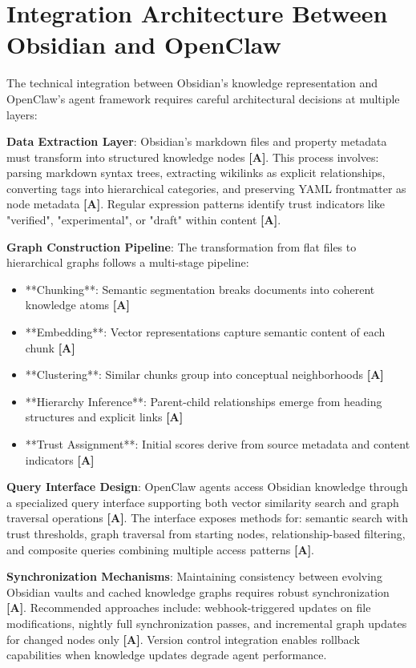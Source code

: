 \documentclass[a4paper,11pt]{article}
\newcommand{\alabel}{\textbf{\textcolor{acolor}{[A]}}}
\begin{document}
\section{Integration Architecture Between Obsidian and OpenClaw}

The technical integration between Obsidian's knowledge representation and OpenClaw's agent framework requires careful architectural decisions at multiple layers:


\textbf{Data Extraction Layer}: Obsidian's markdown files and property metadata must transform into structured knowledge nodes \alabel{}. This process involves: parsing markdown syntax trees, extracting wikilinks as explicit relationships, converting tags into hierarchical categories, and preserving YAML frontmatter as node metadata \alabel{}. Regular expression patterns identify trust indicators like "verified", "experimental", or "draft" within content \alabel{}.


\textbf{Graph Construction Pipeline}: The transformation from flat files to hierarchical graphs follows a multi-stage pipeline:

\begin{itemize}
  \item **Chunking**: Semantic segmentation breaks documents into coherent knowledge atoms \alabel{}
  \item **Embedding**: Vector representations capture semantic content of each chunk \alabel{}
  \item **Clustering**: Similar chunks group into conceptual neighborhoods \alabel{}
  \item **Hierarchy Inference**: Parent-child relationships emerge from heading structures and explicit links \alabel{}
  \item **Trust Assignment**: Initial scores derive from source metadata and content indicators \alabel{}
\end{itemize}

\textbf{Query Interface Design}: OpenClaw agents access Obsidian knowledge through a specialized query interface supporting both vector similarity search and graph traversal operations \alabel{}. The interface exposes methods for: semantic search with trust thresholds, graph traversal from starting nodes, relationship-based filtering, and composite queries combining multiple access patterns \alabel{}.


\textbf{Synchronization Mechanisms}: Maintaining consistency between evolving Obsidian vaults and cached knowledge graphs requires robust synchronization \alabel{}. Recommended approaches include: webhook-triggered updates on file modifications, nightly full synchronization passes, and incremental graph updates for changed nodes only \alabel{}. Version control integration enables rollback capabilities when knowledge updates degrade agent performance.
\end{document}

